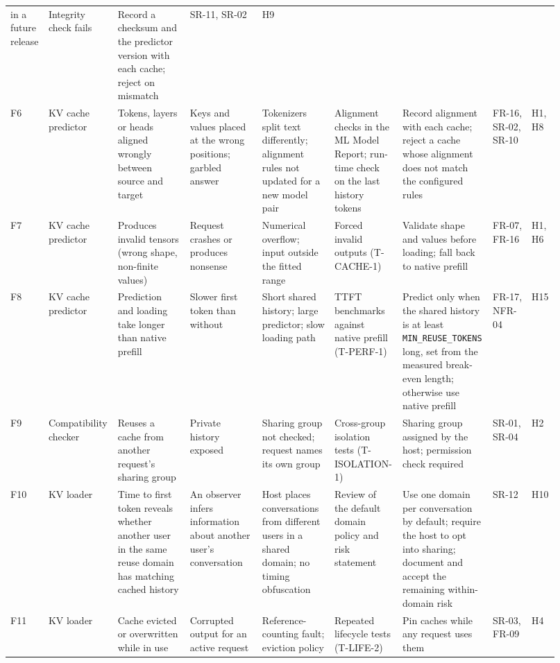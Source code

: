 \documentclass{article}
\begin{document}
\begin{landscape}
\begin{longtable}{@{}p{0.04\linewidth}p{0.10\linewidth}p{0.13\linewidth}%
p{0.13\linewidth}p{0.13\linewidth}p{0.11\linewidth}p{0.16\linewidth}%
p{0.07\linewidth}p{0.05\linewidth}@{}}
in a future release & Integrity check fails & Record a checksum and the
predictor version with each cache; reject on mismatch & SR-11, SR-02 &
H9\\
F6 & KV cache predictor & Tokens, layers or heads aligned wrongly between
source and target & Keys and values placed at the wrong positions; garbled
answer & Tokenizers split text differently; alignment rules not updated
for a new model pair & Alignment checks in the ML Model Report; run-time check on the
last history tokens & Record alignment with each cache; reject a cache whose
alignment does not match the configured rules & FR-16, SR-02, SR-10 & H1,
H8\\
F7 & KV cache predictor & Produces invalid tensors (wrong shape,
non-finite values) & Request crashes or produces nonsense & Numerical
overflow; input outside the fitted range & Forced invalid outputs
(T-CACHE-1) & Validate shape and values before loading; fall back to native
prefill & FR-07, FR-16 & H1, H6\\
F8 & KV cache predictor & Prediction and loading take longer than native
prefill & Slower first token than without \progname{} & Short shared
history; large predictor; slow loading path & TTFT benchmarks against
native prefill (T-PERF-1) & Predict only when the shared history is at
least \texttt{MIN\_REUSE\_TOKENS} long, set from the measured break-even
length; otherwise use native prefill & FR-17, NFR-04 & H15\\
F9 & Compatibility checker & Reuses a cache from another request's sharing
group & Private history exposed & Sharing group not checked; request names
its own group & Cross-group isolation tests (T-ISOLATION-1) & Sharing group
assigned by the host; permission check required & SR-01, SR-04 & H2\\
F10 & KV loader & Time to first token reveals whether another user in the
same reuse domain has matching cached history & An observer infers information
about another user's conversation & Host places conversations from different
users in a shared domain; no timing obfuscation & Review of the default domain
policy and risk statement &
Use one domain per conversation by default; require the host to opt into
sharing; document and accept the remaining within-domain risk & SR-12 & H10\\
F11 & KV loader & Cache evicted or overwritten while in use & Corrupted
output for an active request & Reference-counting fault; eviction policy &
Repeated lifecycle tests (T-LIFE-2) & Pin caches while any request uses them
& SR-03, FR-09 & H4\\

\end{longtable}
\end{landscape}
\end{document}
